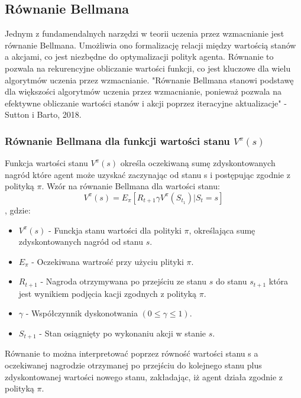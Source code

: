 \documentclass[a4paper, 10pt]{article}
\begin{document}
    \subsection{Równanie Bellmana}
    Jednym z fundamendalnych narzędzi w teorii uczenia przez wzmacnianie jest równanie Bellmana.
    Umożliwia ono formalizację relacji między wartością stanów a akcjami, co jest niezbędne do optymalizacji polityk agenta.
    Równanie to pozwala na rekurencyjne obliczanie wartości funkcji, co jest kluczowe dla wielu algorytmów uczenia przez wzmacnianie.
    "Równanie Bellmana stanowi podstawę dla większości algorytmów uczenia przez wzmacnianie, ponieważ pozwala na efektywne obliczanie wartości stanów i akcji poprzez iteracyjne aktualizacje"
    - Sutton i Barto, 2018.
    \subsubsection{Równanie Bellmana dla funkcji wartości stanu \( V^\pi(s) \)}
    Funkcja wartości stanu \( V^\pi(s) \) określa oczekiwaną sumę zdyskontowanych nagród które agent może uzyskać zaczynając od stanu s
    i postępując zgodnie z polityką \( \pi \). Wzór na równanie Bellmana dla wartości stanu:
    \[ V^\pi(s) = E_\pi[R_{t+1}  \gamma V^\pi(S_{t_1})|S_t = s] \],
    gdzie:
    \begin{itemize}
        \item \( V^\pi(s) \) - Funckja stanu wartości dla polityki \( \pi \), określająca sumę zdyskontowanych nagród od stanu \( s \).
        \item \( E_\pi \) - Oczekiwana wartrość przy użyciu plityki \( \pi \).
        \item \( R_{t+1} \) - Nagroda otrzymywana po przejściu ze stanu \( s \) do stanu \( s_{t+1} \) która jest wynikiem podjęcia kacji zgodnych z polityką \( \pi \).
        \item \( \gamma \) - Współczynnik dyskonotwania \( (0 \leq \gamma \leq 1) \).
        \item \( S_{t+1} \) - Stan osiągnięty po wykonaniu akcji w stanie \( s \).
    \end{itemize}
    Równanie to można interpretować poprzez równość wartości stanu s a oczekiwanej nagrodzie otrzymanej po przejściu do kolejnego stanu plus zdyskontowanej wartości nowego stanu,
    zakładając, iż agent działa zgodnie z polityką \( \pi \).
\end{document}
